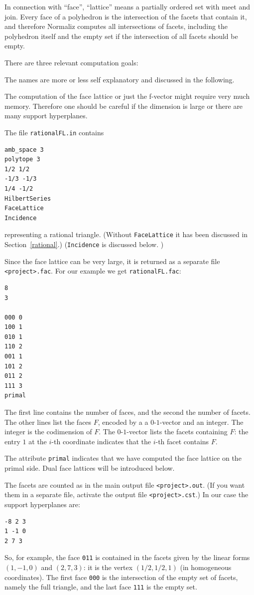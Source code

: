 In connection with ``face'', ``lattice'' means a partially ordered set with meet and join. Every face of a polyhedron is the intersection of the facets that contain it, and therefore Normaliz computes all intersections of facets, including the polyhedron itself and the empty set if the intersection of all facets should be empty.

There are three relevant computation goals:
\begin{itemize}
	\itemtt[FaceLattice]
	\itemtt[FVector]
	\itemtt[Incidence]
\end{itemize}
The names are more or less self explanatory and discussed in the following.

The computation of the face lattice or just the f-vector might require very much memory. Therefore one should be careful if the dimension is large or there are many support hyperplanes.

The file \verb|rationalFL.in| contains
\begin{Verbatim}
amb_space 3
polytope 3
1/2 1/2
-1/3 -1/3
1/4 -1/2
HilbertSeries
FaceLattice
Incidence
\end{Verbatim}
representing a rational triangle. (Without \verb|FaceLattice| it has been discussed in Section~\ref{rational}.) (\verb|Incidence| is discussed below.
)

Since the face lattice can be very large, it is returned as a separate file \verb|<project>.fac|. For our example we get \verb|rationalFL.fac|:
\begin{Verbatim}
8
3

000 0
100 1
010 1
110 2
001 1
101 2
011 2
111 3
primal
\end{Verbatim}
The first line contains the number of faces, and the second the number of facets. The other lines list the faces $F$, encoded by a a $0$-$1$-vector and an integer. The integer is the codimension of $F$. The $0$-$1$-vector lists the facets containing $F$: the entry $1$ at the $i$-th coordinate indicates that the $i$-th facet contains $F$.

The attribute \verb|primal| indicates that we have computed the face lattice on the primal side. Dual face lattices will be introduced below.

The facets are counted as in the main output file \verb|<project>.out|. (If you want them in a separate file, activate the output file \verb|<project>.cst|.) In our case the support hyperplanes are:
\begin{Verbatim}
-8 2 3 
1 -1 0 
2 7 3
\end{Verbatim}
So, for example, the face \verb|011| is contained in the facets given by the linear forms $(1,-1,0)$ and
$(2,7,3)$: it is the vertex $(1/2,1/2,1)$ (in homogeneous coordinates). The first face \verb|000| is the intersection of the empty set of facets, namely the full triangle, and the last face \verb|111| is the empty set.

